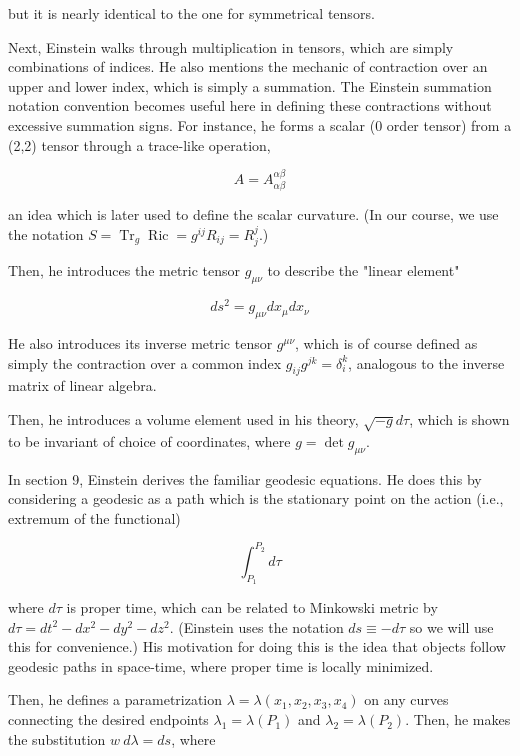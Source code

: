 \documentclass[14pt]{extarticle}
\DeclareMathOperator{\Tr}{Tr}
\DeclareMathOperator{\Ric}{Ric}
\begin{document}
\noindent
but it is nearly identical to the one for symmetrical tensors.

Next, Einstein walks through multiplication in tensors, which are simply combinations of indices. He also mentions the mechanic of contraction over an upper and lower index, which is simply a summation. The Einstein summation notation convention becomes useful here in defining these contractions without excessive summation signs. For instance, he forms a scalar (0 order tensor) from a (2,2) tensor through a trace-like operation,

\[A = A_{\alpha \beta }^{\alpha \beta}\]

\noindent
an idea which is later used to define the scalar curvature. (In our course, we use the notation $S = \Tr_g \Ric = g^{ij} R_{ij} = R^j_j$.)

Then, he introduces the metric tensor $g_{\mu\nu}$ to describe the "linear element"

\[ds^2 = g_{\mu\nu} dx_\mu dx_\nu\]

He also introduces its inverse metric tensor $g^{\mu\nu}$, which is of course defined as simply the contraction over a common index $g_{ij} g^{jk} = \delta_i^k$, analogous to the inverse matrix of linear algebra.

Then, he introduces a volume element used in his theory, $\sqrt{-g}d\tau$, which is shown to be invariant of choice of coordinates, where ${g = \det g_{\mu\nu}}$.




In section 9, Einstein derives the familiar geodesic equations. He does this by considering a geodesic as a path which is the stationary point on the action (i.e., extremum of the functional)

\[\int_{P_1}^{P_2} d\tau\]

\noindent
where $d\tau$ is proper time, which can be related to Minkowski metric by $d\tau = dt^2 - dx^2 - dy^2 - dz^2$. (Einstein uses the notation $ds \equiv -d\tau$ so we will use this for convenience.) His motivation for doing this is the idea that objects follow geodesic paths in space-time, where proper time is locally minimized.

Then, he defines a parametrization $\lambda = \lambda(x_1, x_2, x_3, x_4)$ on any curves connecting the desired endpoints $\lambda_1 = \lambda(P_1)$ and $\lambda_2 = \lambda(P_2)$. Then, he makes the substitution $w \ d\lambda = ds$, where
\end{document}
